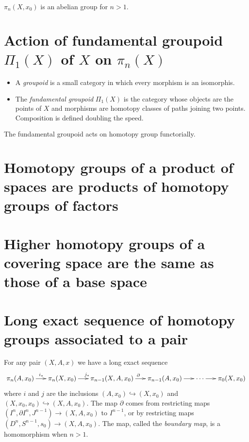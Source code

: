 \begin{proposition}
\label{proposition-commu-highe-homot-group}
$\pi_n(X,x_0)$ is an abelian group for $n>1$.
\end{proposition}

\section{Action of fundamental groupoid
\texorpdfstring{$\Pi_1(X)$}{Π₁(X)} of
\texorpdfstring{$X$}{X} on
\texorpdfstring{$\pi_{n}(X)$}{π₁(X)}}
\label{section-actio-funda-group}

\begin{itemize}
\item A {\it groupoid} is a small category in
which every morphism is an isomorphis.
\item The {\it fundamental groupoid}
$\Pi_{1}(X)$
is the category whose objects
are the points of  $X$ and
morphisms are homotopy classes of paths
joining two points.
Composition is defined doubling the speed.
\end{itemize}

The fundamental groupoid acts on homotopy
group functorially.

\section{Homotopy groups of a product of
spaces
are products of homotopy groups of factors}
\label{section-homot-group-produ-space}

\section{Higher homotopy groups of a covering
space
are the same as those of a base space}
\label{section-highe-homot-group-cover}

\section{Long exact sequence of homotopy
groups associated to a pair}
\label{section-long-exact-seque-homot-grou}

For any pair $(X,A,x)$ we have a long exact
sequence
$$
\xymatrix@C=1.5em{
\pi_n(A,x_0)\ar[r]^{i_*}
& \pi_{n}(X,x_0)\ar[r]^{j_*}
& \pi_{n-1}(X,A,x_0)\ar[r]^{\partial}
& \pi_{n-1}(A,x_0)\ar[r]
& \cdots\ar[r]
& \pi_0(X,x_0)
}
$$
where $i$ and $j$ are the inclusions
$(A,x_0)\hookrightarrow(X,x_0)$ and
$(X,x_0,x_0)\hookrightarrow(X,A,x_0)$. The
map $\partial$ comes from restricting maps
$(I^n,\partial I^n,J^{n-1})\to (X,A,x_0)$ to
$I^{n-1}$, or by restricting maps
$(D^n,S^{n-1},s_0)\to (X,A,x_0)$. The map,
called the {\it boundary map}, is a
homomorphism when $n>1$.

